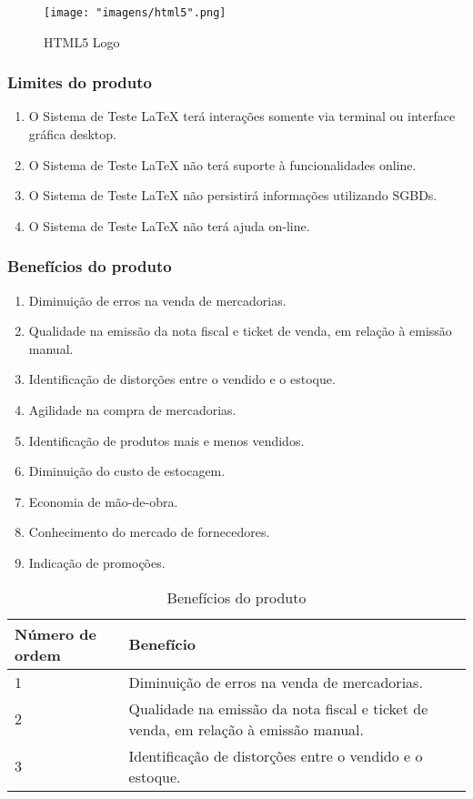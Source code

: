 \documentclass[12pt]{article}
\begin{document}
			\begin{figure}[!h]
				\caption{HTML5 Logo}
				\centering
				\texttt{[image: "imagens/html5".png]}
			\end{figure}
				
		\subsubsection{Limites do produto}
			\begin{enumerate}
					\item O Sistema de Teste LaTeX terá interações somente via terminal ou interface gráfica desktop.
					\item O Sistema de Teste LaTeX não terá suporte à funcionalidades online.
					\item O Sistema de Teste LaTeX não persistirá informações utilizando SGBDs.
					\item O Sistema de Teste LaTeX não terá ajuda on-line.
			\end{enumerate}
						
		\subsubsection{Benefícios do produto}
			\begin{enumerate}
				\item Diminuição de erros na  venda de mercadorias.
				\item Qualidade na emissão da nota fiscal e ticket de venda, em relação à emissão manual.
				\item Identificação de distorções entre o vendido e o estoque.
				\item Agilidade na compra de mercadorias.
				\item Identificação de produtos mais e menos vendidos.
				\item Diminuição do custo de estocagem.
				\item Economia de mão-de-obra.
				\item Conhecimento do mercado de fornecedores.
				\item Indicação de promoções.
			\end{enumerate}
			
			\begin{table}
				\caption{Benefícios do produto}
				\begin{tabularx}{\linewidth}{ | X | X | }
					\hline
					Número de ordem & Benefício\\
					\hline
					1 & Diminuição de erros na  venda de mercadorias.\\
					\hline
					2 & Qualidade na emissão da nota fiscal e ticket de venda, em relação à emissão manual.\\
					\hline
					3 & Identificação de distorções entre o vendido e o estoque.\\
					\hline
				\end{tabularx}
			\end{table}

			
\end{document}
